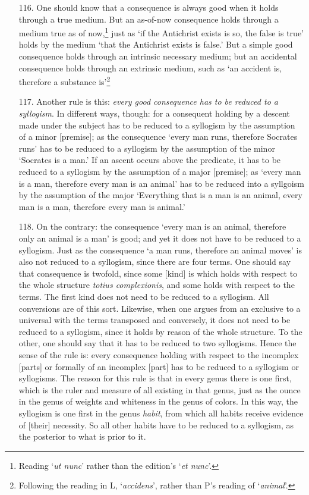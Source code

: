\documentclass[]{article}
\begin{document}
\begin{itemize}
\item[116.] One should know that a consequence is always good when it holds through a true medium. But an as-of-now consequence holds through a medium true as of now,\footnote{Reading `\textit{ut nunc}' rather than the edition's `\textit{et nunc}'.} just as `if the Antichrist exists is so, the false is true' holds by the medium `that the Antichrist exists is false.' But a simple good consequence holds through an intrinsic necessary medium; but an accidental consequence holds through an extrinsic medium, such as `an accident is, therefore a substance is'\footnote{Following the reading in L, `\textit{accidens}', rather than P's reading of `\textit{animal}'.}
\item[117.] Another rule is this: \textit{every good consequence has to be reduced to a syllogism}. In different ways, though: for a consequent holding by a descent made under the subject has to be reduced to a syllogism by the assumption of a minor [premise]; as the consequence `every man runs, therefore Socrates runs' has to be reduced to a syllogism by the assumption of the minor `Socrates is a man.' If an ascent occurs above the predicate, it has to be reduced to a syllogism by the assumption of a major [premise]; as `every man is a man, therefore every man is an animal' has to be reduced into a syllgoism by the assumption of the major `Everything that is a man is an animal, every man is a man, therefore every man is animal.'
\item[118.] On the contrary: the consequence `every man is an animal, therefore only an animal is a man' is good; and yet it does not have to be reduced to a syllogism. Just as the consequence `a man runs, therefore an animal moves' is also not reduced to a syllogism, since there are four terms. One should say that consequence is twofold, since some [kind] is which holds with respect to the whole structure \textit{totius complexionis}, and some holds with respect to the terms. The first kind does not need to be reduced to a syllogism. All conversions are of this sort. Likewise, when one argues from an exclusive to a universal with the terms transposed and conversely, it does not need to be reduced to a syllogism, since it holds by reason of the whole structure. To the other, one should say that it has to be reduced to two syllogisms. Hence the sense of the rule is: every consequence holding with respect to the incomplex [parts] or formally of an incomplex [part] has to be reduced to a syllogism or syllogisms. The reason for this rule is that in every genus there is one first, which is the ruler and measure of all existing in that genus, just as the ounce in the genus of weights and whiteness in the genus of colors. In this way, the syllogism is one first in the genus \textit{habit}, from which all habits receive evidence of [their] necessity. So all other habits have to be reduced to a syllogism, as the posterior to what is prior to it.

\end{itemize}
\end{document}
